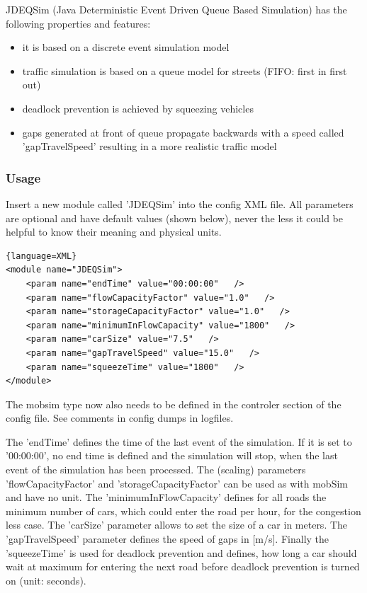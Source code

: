 JDEQSim (Java Deterministic Event Driven Queue Based Simulation) has the following properties and features:
\begin{itemize}
	\item it is based on a discrete event simulation model
	\item traffic simulation is based on a queue model for streets (FIFO: first in first out)
	\item deadlock prevention is achieved by squeezing vehicles
	\item gaps  generated at front of queue propagate backwards with a speed called  'gapTravelSpeed' resulting in a more realistic traffic model
\end{itemize}

\subsubsection{Usage}

Insert  a new module called 'JDEQSim' into the config XML file. All parameters  are optional and have default values (shown below), never the less it  could be helpful to know their meaning and physical units.
\begin{lstlisting}{language=XML}
<module name="JDEQSim">
    <param name="endTime" value="00:00:00"   />
    <param name="flowCapacityFactor" value="1.0"   />
    <param name="storageCapacityFactor" value="1.0"   />
    <param name="minimumInFlowCapacity" value="1800"   />
    <param name="carSize" value="7.5"   />
    <param name="gapTravelSpeed" value="15.0"   />
    <param name="squeezeTime" value="1800"   />
</module>
\end{lstlisting}

The mobsim type now  also needs to be defined in the controler section of the config  file. See comments in config dumps in logfiles.

The  'endTime' defines the time of the last event of the simulation. If it is  set to '00:00:00', no end time is defined and the simulation will stop,  when the last event of the simulation has been processed. The (scaling)  parameters  'flowCapacityFactor' and 'storageCapacityFactor' can  be used as with mobSim and have no unit. The 'minimumInFlowCapacity'  defines for all roads the minimum number of cars, which could enter the  road per hour, for the congestion less case. The 'carSize' parameter  allows to set the size of a car in meters. The 'gapTravelSpeed'  parameter defines the speed of gaps in [m/s]. Finally the 'squeezeTime'  is used for deadlock prevention and defines, how long a car should wait  at maximum for entering the next road before deadlock prevention is  turned on (unit: seconds).

